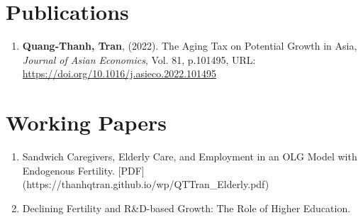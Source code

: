 \section{\sc Publications}
\begin{enumerate}
\item
  {\bf Quang-Thanh, Tran},
  (2022).
  {The Aging Tax on Potential Growth in Asia},
  {\it Journal of Asian Economics}, Vol. 81, p.101495,
  {URL: \url{https://doi.org/10.1016/j.asieco.2022.101495}}
\end{enumerate}

\section{\sc Working Papers}
\begin{enumerate}
  \item Sandwich Caregivers, Elderly Care, and Employment in an OLG Model with Endogenous Fertility. [PDF](https://thanhqtran.github.io/wp/QTTran_Elderly.pdf)
  \item Declining Fertility and R\&D-based Growth: The Role of Higher Education.
\end{enumerate}



